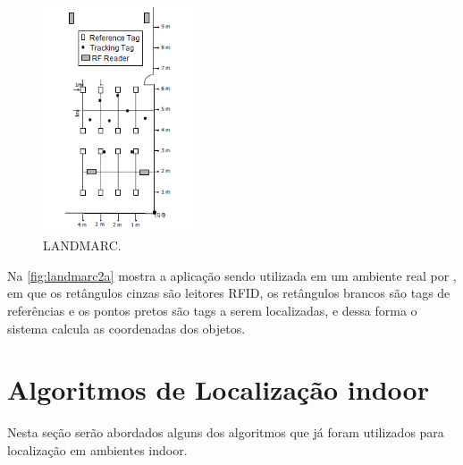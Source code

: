     \begin{figure}[H]
              \caption{\label{fig:landmarc2a}{LANDMARC.}}
              \centering
              \includegraphics[width=0.4\textwidth]{Figuras/landmarc2a(1).png}
        \end{figure}
    \par
    Na \autoref{fig:landmarc2a} mostra a aplicação sendo utilizada em um ambiente real por , em que os retângulos cinzas são leitores RFID, os retângulos brancos são tags de referências e os pontos pretos são tags a serem localizadas, e dessa forma o sistema calcula as coordenadas dos objetos.

\section{Algoritmos de Localização indoor}
Nesta seção serão abordados alguns dos algoritmos que já foram utilizados para localização em ambientes indoor.
